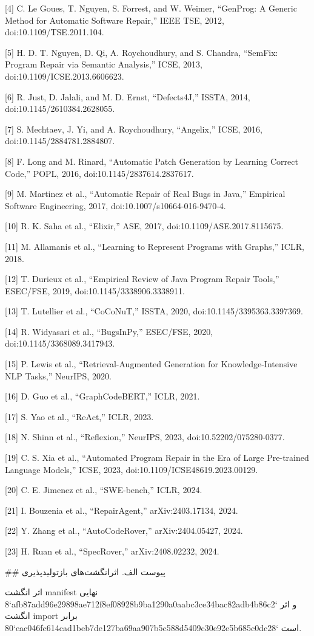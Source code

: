 \documentclass[11pt,a4paper]{article}
\begin{document}
[4] C. Le Goues, T. Nguyen, S. Forrest, and W. Weimer, “GenProg: A Generic Method for Automatic Software Repair,” IEEE TSE, 2012, doi:10.1109/TSE.2011.104.

[5] H. D. T. Nguyen, D. Qi, A. Roychoudhury, and S. Chandra, “SemFix: Program Repair via Semantic Analysis,” ICSE, 2013, doi:10.1109/ICSE.2013.6606623.

[6] R. Just, D. Jalali, and M. D. Ernst, “Defects4J,” ISSTA, 2014, doi:10.1145/2610384.2628055.

[7] S. Mechtaev, J. Yi, and A. Roychoudhury, “Angelix,” ICSE, 2016, doi:10.1145/2884781.2884807.

[8] F. Long and M. Rinard, “Automatic Patch Generation by Learning Correct Code,” POPL, 2016, doi:10.1145/2837614.2837617.

[9] M. Martinez et al., “Automatic Repair of Real Bugs in Java,” Empirical Software Engineering, 2017, doi:10.1007/s10664-016-9470-4.

[10] R. K. Saha et al., “Elixir,” ASE, 2017, doi:10.1109/ASE.2017.8115675.

[11] M. Allamanis et al., “Learning to Represent Programs with Graphs,” ICLR, 2018.

[12] T. Durieux et al., “Empirical Review of Java Program Repair Tools,” ESEC/FSE, 2019, doi:10.1145/3338906.3338911.

[13] T. Lutellier et al., “CoCoNuT,” ISSTA, 2020, doi:10.1145/3395363.3397369.

[14] R. Widyasari et al., “BugsInPy,” ESEC/FSE, 2020, doi:10.1145/3368089.3417943.

[15] P. Lewis et al., “Retrieval-Augmented Generation for Knowledge-Intensive NLP Tasks,” NeurIPS, 2020.

[16] D. Guo et al., “GraphCodeBERT,” ICLR, 2021.

[17] S. Yao et al., “ReAct,” ICLR, 2023.

[18] N. Shinn et al., “Reflexion,” NeurIPS, 2023, doi:10.52202/075280-0377.

[19] C. S. Xia et al., “Automated Program Repair in the Era of Large Pre-trained Language Models,” ICSE, 2023, doi:10.1109/ICSE48619.2023.00129.

[20] C. E. Jimenez et al., “SWE-bench,” ICLR, 2024.

[21] I. Bouzenia et al., “RepairAgent,” arXiv:2403.17134, 2024.

[22] Y. Zhang et al., “AutoCodeRover,” arXiv:2404.05427, 2024.

[23] H. Ruan et al., “SpecRover,” arXiv:2408.02232, 2024.

\#\# پیوست الف. اثرانگشت‌های بازتولیدپذیری

اثر انگشت manifest نهایی `8afb87add96e29898ae712f8ef08928b9ba1290a0aabc3ce34bac82adb4b86c2`
و اثر انگشت import برابر `80eac046fc614cad1beb7de127ba69aa907b5c588d5409c30e92e5b685c0dc28` است.
\end{document}
